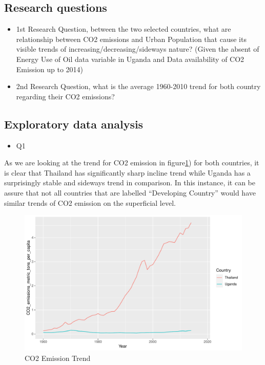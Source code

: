 \documentclass[11pt,a4paper,]{article}
\providecommand{\tightlist}{%
  \setlength{\itemsep}{0pt}\setlength{\parskip}{0pt}}
\begin{document}
\hypertarget{research-questions-1}{%
\subsection{Research questions}\label{research-questions-1}}

\begin{itemize}
\tightlist
\item
  1st Research Question, between the two selected countries, what are relationship between CO2 emissions and Urban Population that cause its visible trends of increasing/decreasing/sideways nature? (Given the absent of Energy Use of Oil data variable in Uganda and Data availability of CO2 Emission up to 2014)
\item
  2nd Research Question, what is the average 1960-2010 trend for both country regarding their CO2 emissions?
\end{itemize}

\hypertarget{exploratory-data-analysis-2}{%
\subsection{Exploratory data analysis}\label{exploratory-data-analysis-2}}

\begin{itemize}
\tightlist
\item
  Q1
\end{itemize}

As we are looking at the trend for CO2 emission in figure\ref{fig:figure1}) for both countries, it is clear that Thailand has significantly sharp incline trend while Uganda has a surprisingly stable and sideways trend in comparison. In this instance, it can be assure that not all countries that are labelled ``Developing Country'' would have similar trends of CO2 emission on the superficial level.

\begin{figure}[H]

{\centering \includegraphics[width=0.7\linewidth]{report_files/figure-latex/figure1-1} 

}

\caption{CO2 Emission Trend}\label{fig:figure1}
\end{figure}
\end{document}
